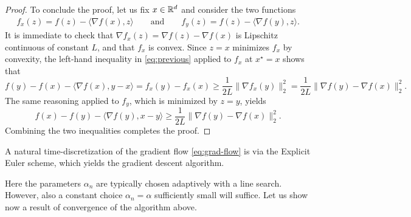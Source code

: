 \begin{proof}
         To conclude the proof, let us fix $x\in \mathbb{R}^d$ and consider the two functions
         \begin{eqnarray}
             f_x(z) = f(z)-\langle \nabla f(x),z\rangle
             \qquad\text{and}\qquad
             f_y(z) = f(z)-\langle \nabla f(y),z\rangle.
         \end{eqnarray}
         It is immediate to check that $\nabla f_x(z) = \nabla f(z)-\nabla f(x)$ is Lipschitz continuous of constant $L$, and that $f_x$ is convex.
         Since $z=x$ minimizes $f_x$ by convexity, the left-hand inequality in \eqref{eq:previous} applied to $f_x$ at $x^\star =x$ shows that
         \begin{equation}
             f(y)-f(x)-\langle \nabla f(x),y-x \rangle = f_x(y)-f_x(x) \ge \frac{1}{2L}\|\nabla f_x(y)\|_2^2 = \frac{1}{2L}\|\nabla f(y)-\nabla f(x)\|_2^2.
         \end{equation}
         The same reasoning applied to $f_y$, which is minimized by $z=y$, yields
         \begin{equation}
             f(x)-f(y)-\langle \nabla f(y),x-y \rangle \ge \frac{1}{2L}\|\nabla f(y)-\nabla f(x)\|_2^2.
         \end{equation}
         Combining the two inequalities completes the proof.
     \end{proof}
 
     A natural time-discretization of the gradient flow \eqref{eq:grad-flow} is via the Explicit Euler scheme, which yields the gradient descent algorithm.
 
 
     Here the parameters $\alpha_n$ are typically chosen adaptively with a line search. However, also a constant choice $\alpha_n = \alpha$ sufficiently small will suffice. Let us show now a result of convergence of the algorithm above.
 
 
